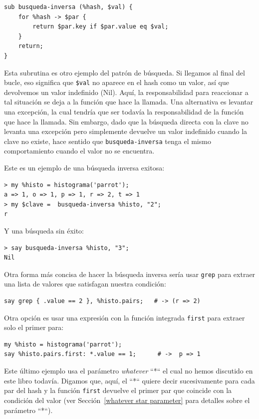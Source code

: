 \begin{verbatim}
sub busqueda-inversa (%hash, $val) { 
    for %hash -> $par { 
        return $par.key if $par.value eq $val;
    }
    return;
}
\end{verbatim}
%
Esta subrutina es otro ejemplo del patrón de búsqueda. 
Si llegamos al final del bucle, eso significa que \verb|$val|
no aparece en el hash como un valor, así que devolvemos un 
valor indefinido (Nil). Aquí, la responsabilidad para reaccionar
a tal situación se deja a la función que hace la llamada. 
Una alternativa es levantar una excepción, la cual tendría
que ser todavía la responsabilidad de la función que hace la
llamada. Sin embargo, dado que la búsqueda directa con la clave
no levanta una excepción pero simplemente devuelve un valor indefinido
cuando la clave no existe, hace sentido que {\tt busqueda-inversa}
tenga el mismo comportamiento cuando el valor no se encuentra.

Este es un ejemplo de una búsqueda inversa exitosa:

\begin{verbatim}
> my %histo = histograma('parrot');
a => 1, o => 1, p => 1, r => 2, t => 1
> my $clave =  busqueda-inversa %histo, "2";
r
\end{verbatim}
%
Y una búsqueda sin éxito:

\begin{verbatim}
> say busqueda-inversa %histo, "3";
Nil
\end{verbatim}
%

Otra forma más concisa de hacer la búsqueda inversa sería
usar {\tt grep} para extraer una lista de valores 
que satisfagan nuestra condición:
\begin{verbatim}
say grep { .value == 2 }, %histo.pairs;   # -> (r => 2)
\end{verbatim}

Otra opción es usar una expresión con la función integrada
{\tt first} para extraer solo el primer para:
\begin{verbatim}
my %histo = histograma('parrot');
say %histo.pairs.first: *.value == 1;      # ->  p => 1
\end{verbatim}

Este último ejemplo usa el parámetro \emph{whatever} ``*``
el cual no hemos discutido en este libro todavía. Digamos que,
aquí, el ``*`` quiere decir sucesivamente para cada par del hash
y la función {\tt first} devuelve el primer par que coincide
con la condición del valor (ver 
Sección~\ref{whatever star parameter} para detalles sobre
el parámetro ``*``).


